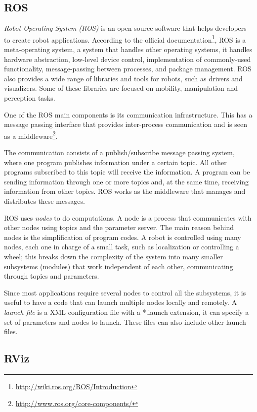 \subsection{ROS}
\label{sec:ros}

\textit{Robot Operating System (ROS)} is an open source software that helps developers to create robot applications. According to the official documentation\footnote{\url{http://wiki.ros.org/ROS/Introduction}}, ROS is a meta-operating system, a system that handles other operating systems, it handles hardware abstraction, low-level device control, implementation of commonly-used functionality, message-passing between processes, and package management. ROS also provides a wide range of libraries and tools for robots, such as drivers and visualizers. Some of these libraries are focused on mobility, manipulation and perception tasks.

One of the ROS main components is its communication infrastructure. This has a message passing interface that provides inter-process communication and is seen as a middleware\footnote{\url{http://www.ros.org/core-components/}}. 

The communication consists of a publish/subscribe message passing system, where one program publishes information under a certain topic. All other programs subscribed to this topic will receive the information. A program can be sending information through one or more topics and, at the same time, receiving information from other topics. ROS works as the middleware that manages and distributes these messages.

ROS uses \textit{nodes} to do computations. A node is a process that communicates with other nodes using topics and the parameter server. The main reason behind nodes is the simplification of program codes. A robot is controlled using many nodes, each one in charge of a small task, such as localization or controlling a wheel; this breaks down the complexity of the system into many smaller subsystems (modules) that work independent of each other, communicating through topics and parameters.

Since most applications require several nodes to control all the subsystems, it is useful to have a code that can launch multiple nodes locally and remotely. A \textit{launch file} is a XML configuration file with a *.launch extension, it can specify a set of parameters and nodes to launch. These files can also include other launch files. 


\subsection{RViz}
\label{subsec:rviz}

